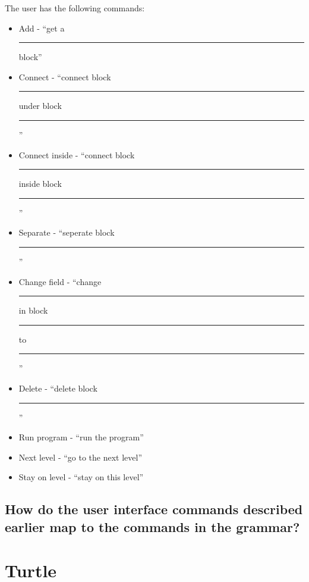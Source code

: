\documentclass[]{article}
\newcommand{\uline}[1]{\rule[0pt]{#1}{0.4pt}}
\begin{document}
The user has the following commands: 
\begin{itemize}
  \item Add  - ``get a \uline{1cm} block''
  \item Connect - ``connect block \uline{.5cm} under block \uline{.5cm}''
  \item Connect inside - ``connect block \uline{.5cm} inside block \uline{.5cm}''
  \item Separate - ``seperate block \uline{.5cm}''
  \item Change field - ``change \uline{.5cm} in block \uline{.5cm} to \uline{.5cm}''
  \item Delete - ``delete block \uline{.5cm}''
  \item Run program - ``run the program''
  \item Next level - ``go to the next level''
  \item Stay on level - ``stay on this level''
\end{itemize}
\subsection{How do the user interface commands described earlier map to the
commands in the grammar?}


\section{Turtle}

\end{document}
